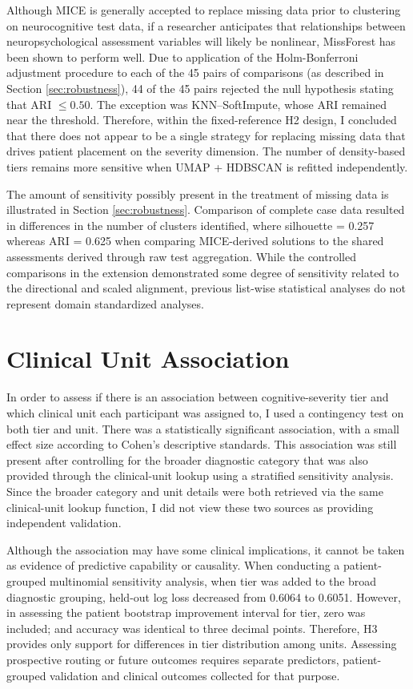 Although MICE is generally accepted to replace missing data prior to clustering on neurocognitive test data, if a researcher anticipates that relationships between neuropsychological assessment variables will likely be nonlinear, MissForest \parencite{stekhoven2012missforest} has been shown to perform well. Due to application of the Holm-Bonferroni adjustment procedure to each of the 45 pairs of comparisons (as described in Section \ref{sec:robustness}), 44 of the 45 pairs rejected the null hypothesis stating that ARI \(\leq 0.50\). The exception was KNN--SoftImpute, whose ARI remained near the threshold. Therefore, within the fixed-reference H2 design, I concluded that there does not appear to be a single strategy for replacing missing data that drives patient placement on the severity dimension. The number of density-based tiers remains more sensitive when UMAP + HDBSCAN is refitted independently.

The amount of sensitivity possibly present in the treatment of missing data is illustrated in Section \ref{sec:robustness}. Comparison of complete case data resulted in differences in the number of clusters identified, where silhouette = 0.257 whereas ARI = 0.625 when comparing MICE-derived solutions to the shared assessments derived through raw test aggregation. While the controlled comparisons in the extension demonstrated some degree of sensitivity related to the directional and scaled alignment, previous list-wise statistical analyses do not represent domain standardized analyses.

\section{Clinical Unit Association}
In order to assess if there is an association between cognitive-severity tier and which clinical unit each participant was assigned to, I used a contingency test on both tier and unit. There was a statistically significant association, with a small effect size according to Cohen's descriptive standards. This association was still present after controlling for the broader diagnostic category that was also provided through the clinical-unit lookup using a stratified sensitivity analysis. Since the broader category and unit details were both retrieved via the same clinical-unit lookup function, I did not view these two sources as providing independent validation.

Although the association may have some clinical implications, it cannot be taken as evidence of predictive capability or causality. When conducting a patient-grouped multinomial sensitivity analysis, when tier was added to the broad diagnostic grouping, held-out log loss decreased from 0.6064 to 0.6051. However, in assessing the patient bootstrap improvement interval for tier, zero was included; and accuracy was identical to three decimal points. Therefore, H3 provides only support for differences in tier distribution among units. Assessing prospective routing or future outcomes requires separate predictors, patient-grouped validation and clinical outcomes collected for that purpose.

